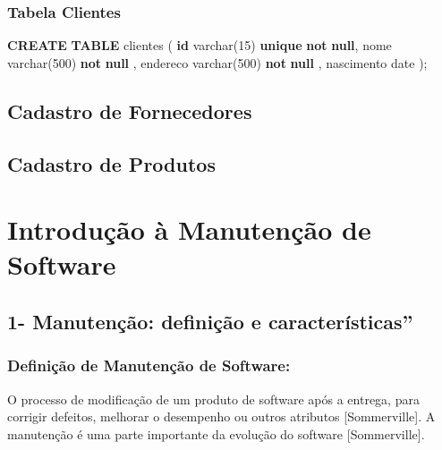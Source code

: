 \documentclass[
]{book}
\newenvironment{Shaded}{\begin{snugshade}}{\end{snugshade}}
\newcommand{\DataTypeTok}[1]{\textcolor[rgb]{0.13,0.29,0.53}{#1}}
\newcommand{\DecValTok}[1]{\textcolor[rgb]{0.00,0.00,0.81}{#1}}
\newcommand{\KeywordTok}[1]{\textcolor[rgb]{0.13,0.29,0.53}{\textbf{#1}}}
\newcommand{\NormalTok}[1]{#1}
\begin{document}
\subsection{Tabela Clientes}\label{tabela-clientes}

\begin{Shaded}
\begin{Highlighting}[]
\KeywordTok{CREATE} \KeywordTok{TABLE}\NormalTok{ clientes}
\NormalTok{(}
\KeywordTok{id}         \DataTypeTok{varchar}\NormalTok{(}\DecValTok{15}\NormalTok{) }\KeywordTok{unique} \KeywordTok{not} \KeywordTok{null}\NormalTok{,}
\NormalTok{nome       }\DataTypeTok{varchar}\NormalTok{(}\DecValTok{500}\NormalTok{) }\KeywordTok{not} \KeywordTok{null}\NormalTok{ ,}
\NormalTok{endereco   }\DataTypeTok{varchar}\NormalTok{(}\DecValTok{500}\NormalTok{) }\KeywordTok{not} \KeywordTok{null}\NormalTok{ ,}
\NormalTok{nascimento }\DataTypeTok{date}
\NormalTok{);}
\end{Highlighting}
\end{Shaded}

\section{Cadastro de Fornecedores}\label{cadastro-de-fornecedores}

\section{Cadastro de Produtos}\label{cadastro-de-produtos}

\chapter{Introdução à Manutenção de Software}\label{introduuxe7uxe3o-uxe0-manutenuxe7uxe3o-de-software}

\section{1- Manutenção: definição e características''}\label{manutenuxe7uxe3o-definiuxe7uxe3o-e-caracteruxedsticas}

\subsection{Definição de Manutenção de Software:}\label{definiuxe7uxe3o-de-manutenuxe7uxe3o-de-software}

O processo de modificação de um produto de software após a entrega, para corrigir defeitos, melhorar o desempenho ou outros atributos {[}Sommerville{]}. A manutenção é uma parte importante da evolução do software {[}Sommerville{]}.
\end{document}
